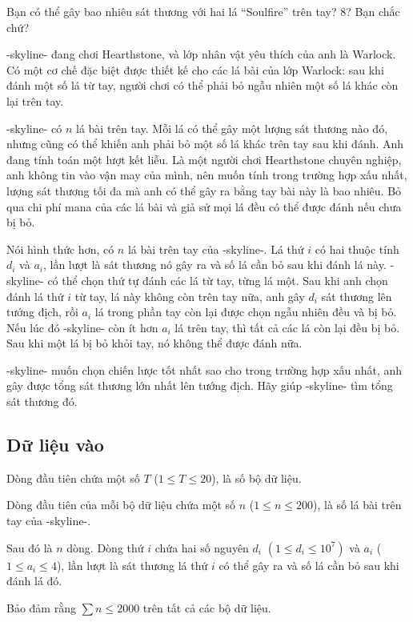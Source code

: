 \documentclass[11pt]{article}
\begin{document}
Bạn có thể gây bao nhiêu sát thương với hai lá ``Soulfire'' trên tay? \(8\)?
Bạn chắc chứ?

-skyline- đang chơi Hearthstone, và lớp nhân vật yêu thích của anh là
Warlock. Có một cơ chế đặc biệt được thiết kế cho các lá bài của lớp Warlock:
sau khi đánh một số lá từ tay, người chơi có thể phải bỏ ngẫu nhiên một số lá
khác còn lại trên tay.

-skyline- có \(n\) lá bài trên tay. Mỗi lá có thể gây một lượng sát thương
nào đó, nhưng cũng có thể khiến anh phải bỏ một số lá khác trên tay sau khi
đánh. Anh đang tính toán một lượt kết liễu. Là một người chơi Hearthstone
chuyên nghiệp, anh không tin vào vận may của mình, nên muốn tính trong trường
hợp xấu nhất, lượng sát thương tối đa mà anh có thể gây ra bằng tay bài này là
bao nhiêu. Bỏ qua chi phí mana của các lá bài và giả sử mọi lá đều có thể
được đánh nếu chưa bị bỏ.

Nói hình thức hơn, có \(n\) lá bài trên tay của -skyline-. Lá thứ \(i\) có hai
thuộc tính \(d_i\) và \(a_i\), lần lượt là sát thương nó gây ra và số lá cần
bỏ sau khi đánh lá này. -skyline- có thể chọn thứ tự đánh các lá từ tay, từng
lá một. Sau khi anh chọn đánh lá thứ \(i\) từ tay, lá này không còn trên tay
nữa, anh gây \(d_i\) sát thương lên tướng địch, rồi \(a_i\) lá trong phần tay
còn lại được chọn ngẫu nhiên đều và bị bỏ. Nếu lúc đó -skyline- còn ít hơn
\(a_i\) lá trên tay, thì tất cả các lá còn lại đều bị bỏ. Sau khi một lá bị bỏ
khỏi tay, nó không thể được đánh nữa.

-skyline- muốn chọn chiến lược tốt nhất sao cho trong trường hợp xấu nhất, anh
gây được tổng sát thương lớn nhất lên tướng địch. Hãy giúp -skyline- tìm tổng
sát thương đó.

\subsection*{Dữ liệu vào}

Dòng đầu tiên chứa một số \(T\) (\(1\le T\le 20\)), là số bộ dữ liệu.

Dòng đầu tiên của mỗi bộ dữ liệu chứa một số \(n\) (\(1\le n\le 200\)), là số
lá bài trên tay của -skyline-.

Sau đó là \(n\) dòng. Dòng thứ \(i\) chứa hai số nguyên \(d_i\)
\((1\le d_i\le 10^7)\) và \(a_i\) (\(1\le a_i\le 4\)), lần lượt là sát thương
lá thứ \(i\) có thể gây ra và số lá cần bỏ sau khi đánh lá đó.

Bảo đảm rằng \(\sum n\le 2000\) trên tất cả các bộ dữ liệu.
\end{document}

